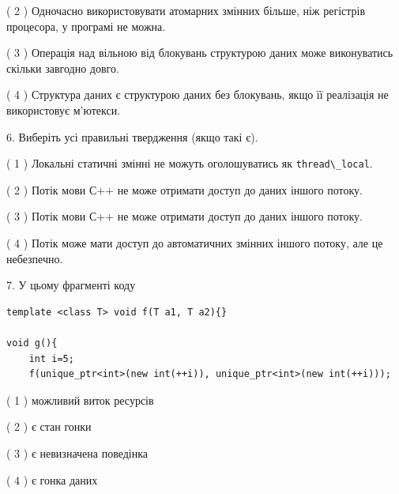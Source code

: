 \documentclass[12pt, ukrainian]{article}
\def\code#1{\Verb!#1!}
\begin{document}
\begin {large}
{( 2 ) Одночасно використовувати атомарних змінних більше, ніж регістрів процесора, у програмі не можна.%

( 3 ) Операція над вільною від блокувань структурою даних може виконуватись скільки завгодно довго.%

( 4 ) Структура даних є структурою даних без блокувань, якщо її реалізація не використовує м’ютекси.%
\newpage



\vspace{5mm}
6. Виберіть усі правильні твердження (якщо такі є).\par
\vspace{2mm}

( 1 ) Локальні статичні змінні не можуть оголошуватись як \code{thread\_local}.%

( 2 ) Потік мови С++ не може отримати доступ до даних іншого потоку.%

( 3 ) Потік мови С++ не може отримати доступ до даних іншого потоку.%

( 4 ) Потік може мати доступ до автоматичних змінних іншого потоку, але це небезпечно.%


\vspace{5mm}
7. У цьому фрагменті коду
\begin{verbatim}
template <class T> void f(T a1, T a2){}

void g(){
    int i=5;
    f(unique_ptr<int>(new int(++i)), unique_ptr<int>(new int(++i)));
\end{verbatim}

( 1 ) можливий виток ресурсів%

( 2 ) є стан гонки%

( 3 ) є невизначена поведінка%

( 4 ) є гонка даних%
}
\end {large}
\end{document}
